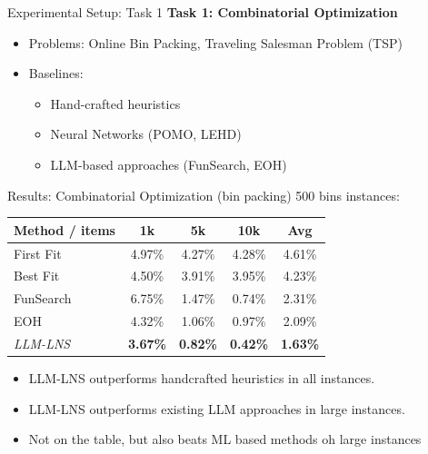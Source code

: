 \documentclass{beamer}
\begin{document}
	\begin{frame}{Experimental Setup: Task 1}
		\textbf{Task 1: Combinatorial Optimization}  		\begin{itemize}
			\item Problems: Online Bin Packing, Traveling Salesman Problem (TSP) 
			\item Baselines: 
\begin{itemize}
\item Hand-crafted heuristics
\item Neural Networks (POMO, LEHD)
\item LLM-based approaches (FunSearch, EOH)
\end{itemize}
		\end{itemize}
		
	                                	\end{frame}


\begin{frame}{Results: Combinatorial Optimization (bin packing)}
500 bins instances:                                                                       	
	\begin{table}[h]
		\centering
		\begin{tabular}{l ccc c}
			\toprule
			\textbf{Method / items} & \textbf{1k} & \textbf{5k} & \textbf{10k} & \textbf{Avg} \\
			\midrule
			First Fit & 4.97\% & 4.27\% & 4.28\% & 4.61\% \\
			Best Fit  & 4.50\% & 3.91\% & 3.95\% & 4.23\% \\
			FunSearch & 6.75\% & 1.47\% & 0.74\% & 2.31\% \\
			EOH       & 4.32\% & 1.06\% & 0.97\% & 2.09\% \\
			\emph{LLM-LNS}      & \textbf{3.67\%} & \textbf{0.82\%} & \textbf{0.42\%} & \textbf{1.63\%} \\
			\bottomrule
		\end{tabular}
		\label{tab:performance_c500}
	\end{table}
	
	\begin{itemize}
		\item LLM-LNS outperforms handcrafted heuristics in all instances.
		\item LLM-LNS outperforms existing LLM approaches in large instances.
		\item Not on the table, but also beats ML based methods oh large instances
	\end{itemize}
	
\end{frame}
\end{document}

